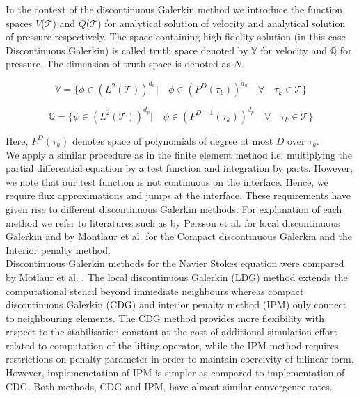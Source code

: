 \documentclass[a4paper]{book}
\begin{document}
In the context of the discontinuous Galerkin method we introduce the function spaces $V$($\mathcal{T}$) and $Q$($\mathcal{T}$) for analytical solution of velocity and analytical solution of pressure respectively. The space containing high fidelity solution (in this case Discontinuous Galerkin) is called truth space denoted by $\mathbb{V}$ for velocity and $\mathbb{Q}$ for pressure. The dimension of truth space is denoted as $N$. 

\begin{equation} \label{velocity_test}
\mathbb{V} = \lbrace \phi \in (L^2(\mathcal{T}))^{d_u}| \quad \phi \in (P^D(\tau_k))^{d_u} \quad \forall \quad {\tau_k} \in \mathcal{T} \rbrace
\end{equation}

\begin{equation} \label{pressure_test}
\mathbb{Q} = \lbrace \psi \in (L^2(\mathcal{T}))^{d_p}| \quad \psi \in (P^{D-1}(\tau_k))^{d_p} \quad \forall \quad {\tau_k} \in \mathcal{T} \rbrace
\end{equation}

Here, $P^D(\tau_k)$ denotes space of polynomials of degree at most $D$ over $\tau_k$.\\

We apply a similar procedure as in the finite element method i.e. multiplying the partial differential equation by a test function and integration by parts. However, we note that our test function is not continuous on the interface. Hence, we require flux approximations and jumps at the interface. These requirements have given rise to different discontinuous Galerkin methods. For explanation of each method we refer to literatures such as by Persson et al. \cite{persson} for local discontinuous Galerkin and by Montlaur et al. \cite{Montlaur} for the Compact discontinuous Galerkin and the Interior penalty method. \\

Discontinuous Galerkin methods for the Navier Stokes equation were compared by Motlaur et al. \cite{Montlaur}. The local discontinuous Galerkin (LDG) method extends the computational stencil beyond immediate neighbours whereas compact discontinuous Galerkin (CDG) and interior penalty method (IPM) only connect to neighbouring elements. The CDG method provides more flexibility with respect to the stabilisation constant at the cost of additional simulation effort related to computation of the lifting operator, while the IPM method requires restrictions on penalty parameter in order to maintain coercivity of bilinear form. However, implemenetation of IPM is simpler as compared to implementation of CDG. Both methods, CDG and IPM, have almost similar convergence rates. 
\end{document}
